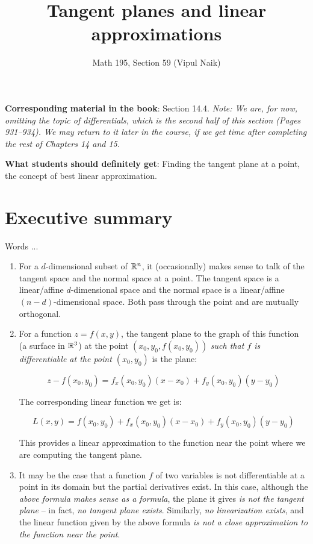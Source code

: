 \documentclass[10pt]{amsart}
\title{Tangent planes and linear approximations}
\author{Math 195, Section 59 (Vipul Naik)}
\begin{document}
\maketitle

{\bf Corresponding material in the book}: Section 14.4. {\em Note: We
are, for now, omitting the topic of differentials, which is the second
half of this section (Pages 931--934). We may return to it later in
the course, if we get time after completing the rest of Chapters 14
and 15.}

{\bf What students should definitely get}: Finding the tangent plane
at a point, the concept of best linear approximation.

\section*{Executive summary}

Words ...

\begin{enumerate}
\item For a $d$-dimensional subset of $\mathbb{R}^n$, it (occasionally) makes
  sense to talk of the tangent space and the normal space at a
  point. The tangent space is a linear/affine $d$-dimensional space
  and the normal space is a linear/affine $(n - d)$-dimensional
  space. Both pass through the point and are mutually orthogonal.
\item For a function $z = f(x,y)$, the tangent plane to the graph of
  this function (a surface in $\mathbb{R}^3$) at the point
  $(x_0,y_0,f(x_0,y_0))$ {\em such that $f$ is differentiable at the
    point $(x_0,y_0)$} is the plane:

  $$z - f(x_0,y_0) = f_x(x_0,y_0)(x - x_0) + f_y(x_0,y_0)(y - y_0)$$

  The corresponding linear function we get is:

  $$L(x,y) = f(x_0,y_0) + f_x(x_0,y_0)(x - x_0) + f_y(x_0,y_0)(y - y_0)$$

  This provides a linear approximation to the function near the point
  where we are computing the tangent plane.
\item It may be the case that a function $f$ of two variables is not
  differentiable at a point in its domain but the partial derivatives
  exist. In this case, although the {\em above formula makes sense as
    a formula}, the plane it gives {\em is not the tangent plane} --
  in fact, {\em no tangent plane exists}. Similarly, {\em no
    linearization exists}, and the linear function given by the above
  formula {\em is not a close approximation to the function near the
    point}.
\end{enumerate}
\end{document}
